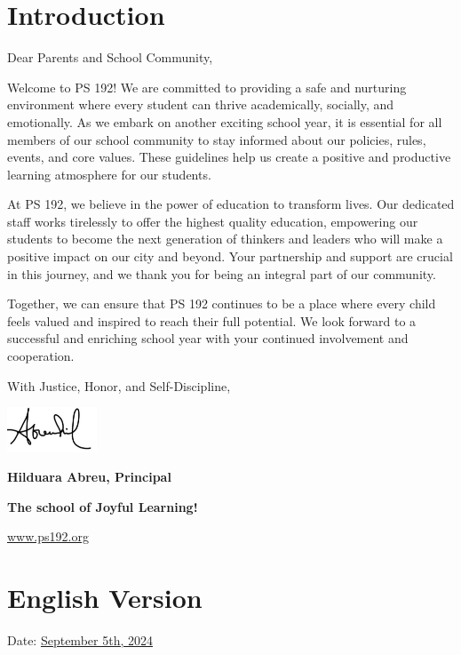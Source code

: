 \documentclass[letterpaper, 12pt]{article}
\begin{document}
\pagebreak
\vspace*{-1cm}

\section*{Introduction}
\label{sec:org466b5a6}
Dear Parents and School Community,

Welcome to PS 192! We are committed to providing a safe and nurturing environment where every student can thrive academically, socially, and emotionally. As we embark on another exciting school year, it is essential for all members of our school community to stay informed about our policies, rules, events, and core values. These guidelines help us create a positive and productive learning atmosphere for our students.

At PS 192, we believe in the power of education to transform lives. Our dedicated staff works tirelessly to offer the highest quality education, empowering our students to become the next generation of thinkers and leaders who will make a positive impact on our city and beyond. Your partnership and support are crucial in this journey, and we thank you for being an integral part of our community.

Together, we can ensure that PS 192 continues to be a place where every child feels valued and inspired to reach their full potential. We look forward to a successful and enriching school year with your continued involvement and cooperation.

With Justice, Honor, and Self-Discipline,

\includegraphics[width=0.2\textwidth]{hil_signature}

\textbf{Hilduara Abreu, Principal}

\textbf{The school of Joyful Learning!}

\href{www.ps192.org}{www.ps192.org}

\pagebreak
\vspace*{-1cm}

\section*{English Version}
\label{sec:orgc2a5704}
Date: \href{www.ps192.org}{September 5th, 2024}
\end{document}
